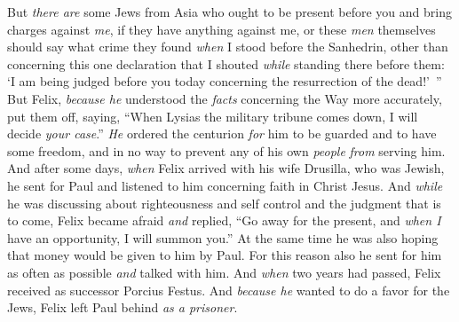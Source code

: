 \begin{biblechapter}
\verse But \textit{there are} some Jews from Asia who ought to be present before you and bring charges against \textit{me}, if they have anything against me,
\verse or these \textit{men} themselves should say what crime they found \textit{when} I stood before the Sanhedrin,
\verse other than concerning this one declaration that I shouted \textit{while} standing there before them: ‘I am being judged before you today concerning the resurrection of the dead!’ ”
 But Felix, \textit{because he} understood the \textit{facts} concerning the Way more accurately, put them off, saying, “When Lysias the military tribune comes down, I will decide \textit{your case}.”
\verse \textit{He} ordered the centurion \textit{for} him to be guarded and to have some freedom, and in no way to prevent any of his own \textit{people} \textit{from} serving him.
\verse And after some days, \textit{when} Felix arrived with his wife Drusilla, who was Jewish, he sent for Paul and listened to him concerning faith in Christ Jesus.
\verse And \textit{while} he was discussing about righteousness and self control and the judgment that is to come, Felix became afraid \textit{and} replied, “Go away for the present, and \textit{when I} have an opportunity, I will summon you.”
\verse At the same time he was also hoping that money would be given to him by Paul. For this reason also he sent for him as often as possible \textit{and} talked with him.
\verse And \textit{when} two years had passed, Felix received as successor Porcius Festus. And \textit{because he} wanted to do a favor for the Jews, Felix left Paul behind \textit{as a prisoner}.
\end{biblechapter}


